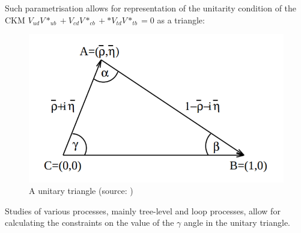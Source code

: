 Such parametrisation allows for representation of the unitarity condition of the CKM $V_{ud}V*_{ub} + V_{cd}V*_{cb}+ * V_{td}V*_{tb} = 0$ as a triangle:


\begin{figure}
  \centering
  \includegraphics[width=0.6\linewidth]{figures/chapter1/UnitaryTriangle.png}
  \caption{A unitary triangle (source: \cite{buras2002unitarity})}
  \label{fig:unitary_triangle}
\end{figure}

Studies of various processes, mainly tree-level and loop processes, allow for calculating the constraints on the value of the $\gamma$ angle in the unitary triangle.


